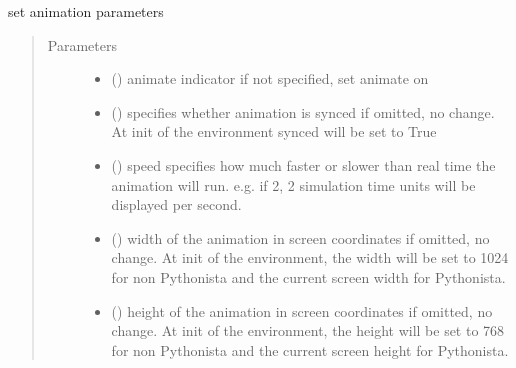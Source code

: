 \documentclass[letterpaper,10pt,english]{sphinxmanual}
\begin{document}
\begin{fulllineitems}

\begin{fulllineitems}
\label{\detokenize{Reference:salabim.Environment.animation_parameters}}
set animation parameters
\begin{quote}\begin{description}
\item[{Parameters}] \leavevmode\begin{itemize}
\item {} 
 () \textendash{} animate indicator 
if not specified, set animate on 

\item {} 
 () \textendash{} specifies whether animation is synced 
if omitted, no change. At init of the environment synced will be set to True

\item {} 
 () \textendash{} speed 
specifies how much faster or slower than real time the animation will run.
e.g. if 2, 2 simulation time units will be displayed per second.

\item {} 
 () \textendash{} width of the animation in screen coordinates 
if omitted, no change. At init of the environment, the width will be
set to 1024 for non Pythonista and the current screen width for Pythonista.

\item {} 
 () \textendash{} height of the animation in screen coordinates 
if omitted, no change. At init of the environment, the height will be
set to 768 for non Pythonista and the current screen height for Pythonista.


\end{itemize}
\end{description}
\end{quote}
\end{fulllineitems}
\end{fulllineitems}
\end{document}
